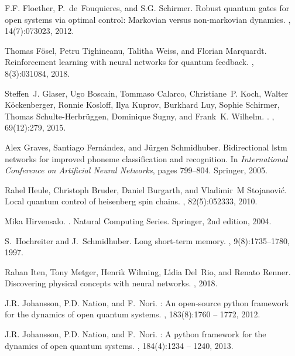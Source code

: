 \documentclass[aps,pra,showkeys,showpacs,notitlepage,superscriptaddress]{revtex4-1}
\newcommand{\1}{{\rm 1\hspace{-0.9mm}l}}
\begin{document}
\begin{thebibliography}{10}
  F.F. Floether, P.~de~Fouquieres, and S.G. Schirmer.
  \newblock Robust quantum gates for open systems via optimal control: Markovian
  versus non-markovian dynamics.
  , 14(7):073023, 2012.
  
  Thomas F{\"o}sel, Petru Tighineanu, Talitha Weiss, and Florian Marquardt.
  \newblock Reinforcement learning with neural networks for quantum feedback.
  , 8(3):031084, 2018.
  
  Steffen~J. Glaser, Ugo Boscain, Tommaso Calarco, Christiane~P. Koch, Walter
  K{\"{o}}ckenberger, Ronnie Kosloff, Ilya Kuprov, Burkhard Luy, Sophie
  Schirmer, Thomas Schulte-Herbr{\"{u}}ggen, Dominique Sugny, and Frank~K.
  Wilhelm.
  .
  , 69(12):279, 2015.
  
  Alex Graves, Santiago Fern{\'a}ndez, and J{\"u}rgen Schmidhuber.
  \newblock Bidirectional lstm networks for improved phoneme classification and
  recognition.
  \newblock In {\em International Conference on Artificial Neural Networks},
  pages 799--804. Springer, 2005.
  
  Rahel Heule, Christoph Bruder, Daniel Burgarth, and Vladimir~M Stojanovi{\'c}.
  \newblock Local quantum control of heisenberg spin chains.
  , 82(5):052333, 2010.
  
  Mika Hirvensalo.
  .
  \newblock Natural Computing Series. Springer, 2nd edition, 2004.
  
  S.~Hochreiter and J.~Schmidhuber.
  \newblock Long short-term memory.
  , 9(8):1735--1780, 1997.
  
  Raban Iten, Tony Metger, Henrik Wilming, L{\'\i}dia Del~Rio, and Renato Renner.
  \newblock Discovering physical concepts with neural networks.
  , 2018.
  
  J.R. Johansson, P.D. Nation, and F.~Nori.
  : An open-source python framework for the dynamics of open
  quantum systems.
  , 183(8):1760 -- 1772, 2012.
  
  J.R. Johansson, P.D. Nation, and F.~Nori.
  : A python framework for the dynamics of open quantum
  systems.
  , 184(4):1234 -- 1240, 2013.
  

\end{thebibliography}
\end{document}
